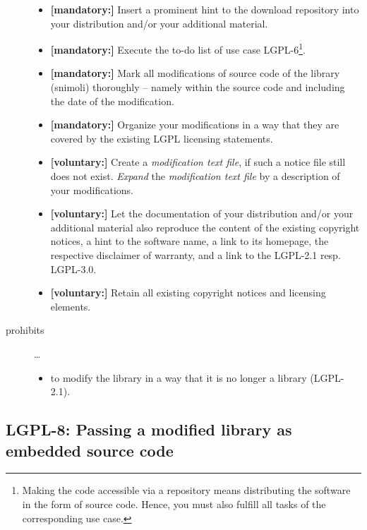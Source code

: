 \begin{description}
\begin{itemize}
  \item \textbf{[mandatory:]} Insert a prominent hint to the download repository
  into your distribution and/or your additional material.
  
  \item \textbf{[mandatory:]} Execute the to-do list of use case LGPL-6\footnote{
  Making the code accessible via a repository means distributing the software in
  the form of source code. Hence, you must also fulfill all tasks of the
  corresponding use case.}.

  \item \textbf{[mandatory:]} Mark all modifications of source code of the
  library (snimoli) thoroughly -- namely within the source code and including
  the date of the modification.
  
  \item \textbf{[mandatory:]} Organize your modifications in a way that they are
  covered by the existing LGPL licensing statements.

  \item \textbf{[voluntary:]} Create a \emph{modification text file}, if such a
  notice file still does not exist. \emph{Expand} the \emph{modification text
  file} by a description of your modifications.

  \item \textbf{[voluntary:]} Let the documentation of your distribution and/or
  your additional material also reproduce the content of the existing
  copyright notices, a hint to the software name, a link to its homepage,
  the respective disclaimer of warranty, and a link to the LGPL-2.1 resp.
  LGPL-3.0.
  
  \item \textbf{[voluntary:]} Retain all existing copyright notices and
  licensing elements. 
  
\end{itemize}

\item[prohibits] \ldots
\begin{itemize}
  \item to modify the library in a way that it is no longer a library
  (LGPL-2.1).
\end{itemize}

\end{description}

\subsection{LGPL-8: Passing a modified library as embedded source code}
\label{OSUC-10-LGPL}

